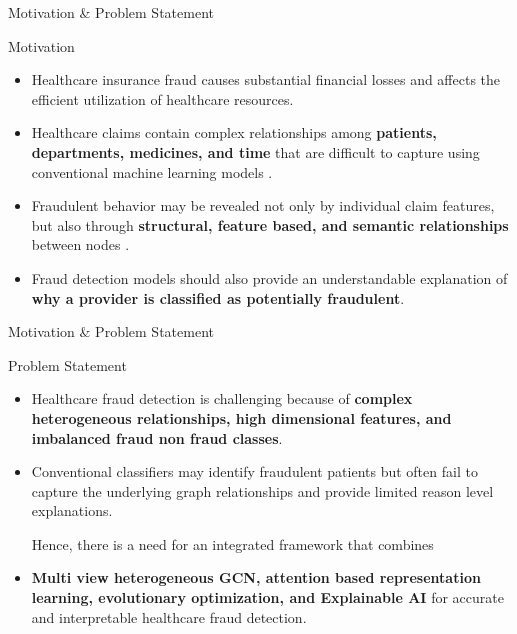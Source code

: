 \documentclass[aspectratio=169,11pt]{beamer}
\begin{document}
\begin{frame}{Motivation \& Problem Statement}

\begin{block}{Motivation}
\begin{itemize}
    \item Healthcare insurance fraud causes substantial financial losses and
    affects the efficient utilization of healthcare resources.

    \item Healthcare claims contain complex relationships among
    \textbf{patients, departments, medicines, and time} that are difficult
    to capture using conventional machine learning models \cite{ref4}.

    \item Fraudulent behavior may be revealed not only by individual claim
 features, but also through \textbf{structural, feature based, and
    semantic relationships} between nodes \cite{ref4}.

    

    \item Fraud detection models should also provide an understandable
    explanation of \textbf{why a provider is classified as potentially
    fraudulent}.
\end{itemize}
\end{block}
\end{frame}

\begin{frame}{Motivation \& Problem Statement}
\begin{block}{Problem Statement}
\begin{itemize}
    \item Healthcare fraud detection is challenging because of
\textbf{complex heterogeneous relationships, high dimensional features,
and imbalanced fraud non fraud classes}.
    \item Conventional classifiers may
identify fraudulent patients but often fail to capture the underlying
graph relationships and provide limited reason level explanations.


Hence, there is a need for an integrated framework that combines
\item \textbf{Multi view heterogeneous GCN, attention based representation
learning, evolutionary optimization, and Explainable AI} for accurate
and interpretable healthcare fraud detection.
\end{itemize}
\end{block}

\end{frame}
\end{document}
